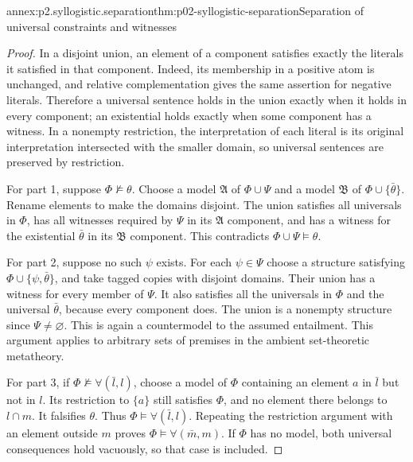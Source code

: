 \begin{annexitem}{annex:p2.syllogistic.separation}{thm:p02-syllogistic-separation}{Separation of universal constraints and witnesses}
\begin{proof}
In a disjoint union, an element of a component satisfies exactly the literals
it satisfied in that component. Indeed, its membership in a positive atom is
unchanged, and relative complementation gives the same assertion for negative
literals. Therefore a universal sentence holds in the union exactly when it
holds in every component; an existential holds exactly when some component
has a witness. In a nonempty restriction, the interpretation of each literal
is its original interpretation intersected with the smaller domain, so
universal sentences are preserved by restriction.

For part 1, suppose \(\Phi\not\models\theta\). Choose a model
\(\mathfrak A\) of \(\Phi\cup\Psi\) and a model \(\mathfrak B\) of
\(\Phi\cup\{\bar\theta\}\). Rename elements to make the domains disjoint.
The union satisfies all universals in \(\Phi\), has all witnesses required
by \(\Psi\) in its \(\mathfrak A\) component, and has a witness for the
existential \(\bar\theta\) in its \(\mathfrak B\) component. This
contradicts \(\Phi\cup\Psi\models\theta\).

For part 2, suppose no such \(\psi\) exists. For each \(\psi\in\Psi\)
choose a structure satisfying \(\Phi\cup\{\psi,\bar\theta\}\), and take
tagged copies with disjoint domains. Their union has a witness for every
member of \(\Psi\). It also satisfies all the universals in \(\Phi\)
and the universal \(\bar\theta\), because every component does. The union
is a nonempty structure since \(\Psi\ne\varnothing\). This is again a
countermodel to the assumed entailment. This argument applies to arbitrary
sets of premises in the ambient set-theoretic metatheory.

For part 3, if \(\Phi\not\models\forall(\bar l,l)\), choose a model of
\(\Phi\) containing an element \(a\) in \(\bar l\) but not in \(l\).
Its restriction to \(\{a\}\) still satisfies \(\Phi\), and no element
there belongs to \(l\cap m\). It falsifies \(\theta\). Thus
\(\Phi\models\forall(\bar l,l)\). Repeating the restriction argument
with an element outside \(m\) proves
\(\Phi\models\forall(\bar m,m)\). If \(\Phi\) has no model, both
universal consequences hold vacuously, so that case is included.
\end{proof}
\end{annexitem}

